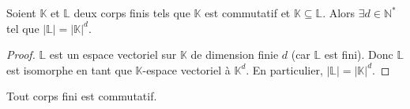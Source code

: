 






  \begin{lemma}
    \label{theoreme-de-wedderburn-1}
    Soient $\mathbb{K}$ et $\mathbb{L}$ deux corps finis tels que $\mathbb{K}$ est commutatif et $\mathbb{K} \subseteq \mathbb{L}$. Alors $\exists d \in \mathbb{N}^*$ tel que $|\mathbb{L}| = |\mathbb{K}|^d$.
  \end{lemma}

  \begin{proof}
    $\mathbb{L}$ est un espace vectoriel sur $\mathbb{K}$ de dimension finie $d$ (car $\mathbb{L}$ est fini). Donc $\mathbb{L}$ est isomorphe en tant que $\mathbb{K}$-espace vectoriel à $\mathbb{K}^d$. En particulier, $|\mathbb{L}| = |\mathbb{K}|^d$.
  \end{proof}

  \begin{theorem}[Wedderburn]
    Tout corps fini est commutatif.
  \end{theorem}

